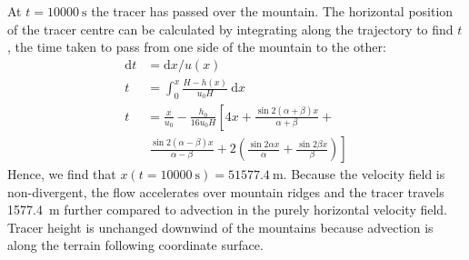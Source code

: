 \documentclass[twocol]{ametsoc}
\begin{document}
At $t = \SI{10000}{\second}$ the tracer has passed over the mountain.  The horizontal position of the tracer centre can be calculated by integrating along the trajectory to find $t$, the time taken to pass from one side of the mountain to the other:
\begin{align}
	\mathrm{d}t &= \mathrm{d}x / u(x) \\
	t &= \int_0^x \frac{H - h(x)}{u_0 H}\:\mathrm{d}x \\
	t &= \frac{x}{u_0} - \frac{h_0}{16 u_0 H} \left[ 4x + \frac{\sin 2 (\alpha + \beta) x}{\alpha + \beta} \right.+ \nonumber \\
   &\ \left. \frac{\sin 2(\alpha - \beta) x}{\alpha - \beta} + 2 \left( \frac{\sin 2\alpha x}{\alpha} + \frac{\sin 2\beta x}{\beta} \right) \right]
\end{align}
Hence, we find that \(x(t=\SI{10000}{\second}) = \SI{51577.4}{\meter}\).  Because the velocity field is non-divergent, the flow accelerates over mountain ridges and the tracer travels \SI{1577.4}{\meter} further compared to advection in the purely horizontal velocity field.  Tracer height is unchanged downwind of the mountains because advection is along the terrain following coordinate surface.
\end{document}

